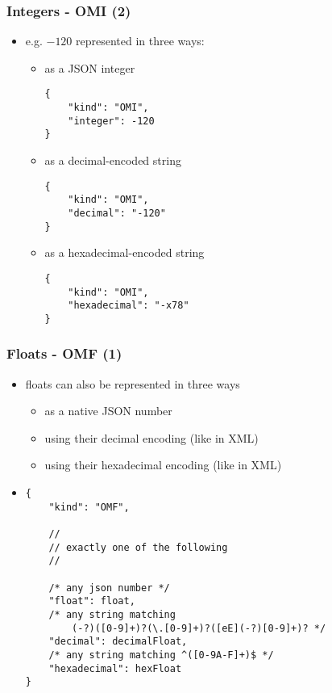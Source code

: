 \documentclass[usenames,dvipsnames]{beamer}
\begin{document}
\begin{frame}[fragile]
    \frametitle{Integers - OMI (2)}
    \begin{itemize}
    \item e.g. $-120$ represented in three ways:
    \begin{itemize}
        \item as a JSON integer
\begin{lstlisting}
{
    "kind": "OMI",
    "integer": -120
}
\end{lstlisting}
        \item as a decimal-encoded string
\begin{lstlisting}
{
    "kind": "OMI",
    "decimal": "-120"
}
\end{lstlisting}
        \item as a hexadecimal-encoded string
\begin{lstlisting}
{
    "kind": "OMI",
    "hexadecimal": "-x78"
}
\end{lstlisting}
        \end{itemize}
    \end{itemize}
\end{frame}

\begin{frame}[fragile]
    \frametitle{Floats - OMF (1)}
    \begin{itemize}
        \item floats can also be represented in three ways
        \begin{itemize}
            \item as a native JSON number
            \item using their decimal encoding (like in XML)
            \item using their hexadecimal encoding (like in XML)
        \end{itemize}
        \item
\begin{lstlisting}
{
    "kind": "OMF",

    //
    // exactly one of the following
    //

    /* any json number */
    "float": float,
    /* any string matching 
        (-?)([0-9]+)?(\.[0-9]+)?([eE](-?)[0-9]+)? */
    "decimal": decimalFloat,
    /* any string matching ^([0-9A-F]+)$ */
    "hexadecimal": hexFloat 
}
\end{lstlisting}
    \end{itemize}
\end{frame}
\end{document}
